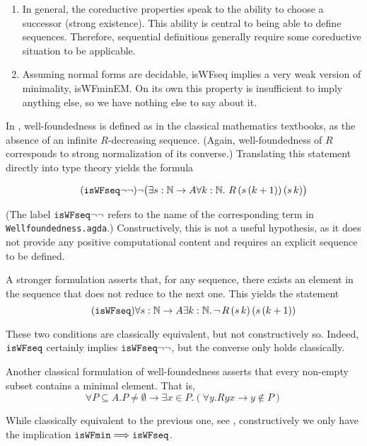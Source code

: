 \begin{enumerate}
  \item In general, the coreductive properties speak to the ability to choose
  a successor (strong existence).  This ability is central to being able to
  define sequences.  Therefore, sequential definitions generally require
  some coreductive situation to be applicable.

  \item Assuming normal forms are decidable,
  isWFseq implies a very weak version of minimality, isWFminEM.
  On its own this property is insufficient to imply anything else,
  so we have nothing else to say about it.
\end{enumerate}



In \cite{Terese}, well-foundedness is defined as in the classical mathematics textbooks,
as the absence of an infinite $R$-decreasing sequence.
(Again, well-foundedness of $R$ corresponds to strong normalization of its converse.)
Translating this statement directly into type theory yields the formula

\[\tag{$\isWFseqm$} \lnot \big(\exists s : \nat \to A \forall k : \nat. \  R \,(s\,(k+1)) \, (s\, k) \big) \]

(The label $\mathtt{isWFseq}{\lnot\lnot}$ refers to the name of the corresponding term in \texttt{Wellfoundedness.agda}.)
Constructively, this is not a useful hypothesis, as it does not provide any positive computational content and requires an explicit sequence to be defined.

A stronger formulation asserts that, for any sequence, there exists an element
in the sequence that does not reduce to the next one.  This yields the statement
\[\tag{$\isWFseq$} \forall s : \nat \to A \exists k : \nat.\, \lnot \, R \,(s\,k)\,(s\,(k+1)) \]

These two conditions are classically equivalent, but not constructively so.
Indeed, $\mathtt{isWFseq}$ certainly implies $\mathtt{isWFseq}{\lnot\lnot}$, but the converse only holds classically.

Another classical formulation of well-foundedness
asserts that every non-empty subset
contains a minimal element.  That is,
\[ \tag{$\isWFmin$} \forall P \subseteq A. P \neq \emptyset \to \exists x \in P. (\forall y. Ryx \to y\notin P) \]

While classically equivalent to the previous one, see \cite[Exercise A.1.8]{Terese},
constructively we only have the implication $\mathtt{isWFmin} \Longrightarrow \mathtt{isWFseq}$.

